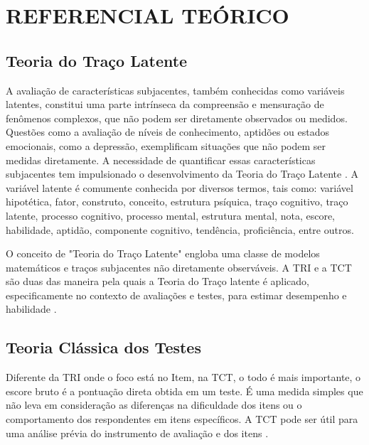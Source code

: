 \chapter{REFERENCIAL TEÓRICO}

\section{Teoria do Traço Latente}


 A avaliação de características subjacentes, também conhecidas como variáveis latentes, constitui uma parte intrínseca da compreensão e mensuração de fenômenos complexos, que não podem ser diretamente observados ou medidos. Questões como a avaliação de níveis de conhecimento, aptidões ou estados emocionais, como a depressão, exemplificam situações que não podem ser medidas diretamente. A necessidade de quantificar essas características subjacentes tem impulsionado o desenvolvimento da Teoria do Traço Latente \cite{pasquali2003fundamentos}. A variável latente é comumente conhecida por diversos termos, tais como: variável hipotética, fator, construto, conceito, estrutura psíquica, traço cognitivo, traço latente, processo cognitivo, processo mental, estrutura mental, nota, escore, habilidade, aptidão, componente cognitivo, tendência, proficiência, entre outros.

O conceito de "Teoria do Traço Latente" engloba uma classe de modelos matemáticos e traços subjacentes não diretamente observáveis. A TRI e a TCT são duas das maneira pela quais a Teoria do Traço latente é aplicado, especificamente no contexto de avaliações e testes, para estimar desempenho e habilidade \cite{pasquali2018}.

\section{Teoria Clássica dos Testes}

Diferente da TRI onde o foco está no Item, na TCT, o todo é mais importante, o escore bruto é a pontuação direta obtida em um teste. É uma medida simples que não leva em consideração as diferenças na dificuldade dos itens ou o comportamento dos respondentes em itens específicos. A TCT pode ser útil para uma análise prévia do instrumento de avaliação e dos itens \cite{pasquali1996}.


\begin{comment}
	Na TCT a dificuldade do Item é calculado a partir da proporção de sujeitos que respondem corretamente tal item. O escore bruto é calculado somando-se o número de respostas corretas.
	
 Neste trabalho, são aplicados alguns procedimentos da Teoria Clássica dos Testes, incluindo a análise da Correlação Ponto-Bisserial e do Coeficiente Alfa de Cronbach.
\end{comment}

